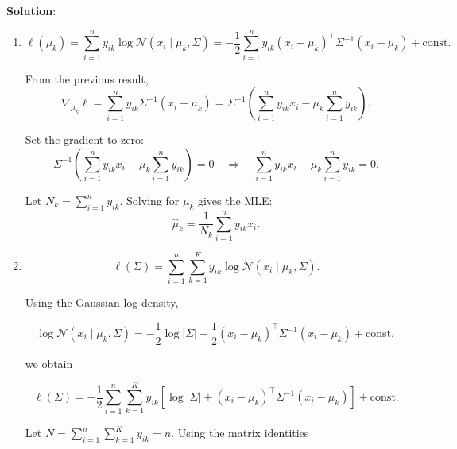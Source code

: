 \documentclass[submit]{harvardml}
\newenvironment{solution}{
    \vspace{2mm}
    \color{blue}\noindent\textbf{Solution}:
}{}
\begin{document}
\begin{solution}
\begin{enumerate}
\[
\nabla_{\mu_k} \ell
=
\sum_{i=1}^{n}
y_{ik}\Sigma^{-1}(x_i-\mu_k).
\]

Factoring out \(\Sigma^{-1}\),

\[
\nabla_{\mu_k} \ell
=
\Sigma^{-1}
\left(
\sum_{i=1}^{n} y_{ik} x_i
-
\mu_k \sum_{i=1}^{n} y_{ik}
\right).
\]

Let
\[
N_k = \sum_{i=1}^{n} y_{ik}.
\]

Then the gradient simplifies to

\[
\nabla_{\mu_k} \ell
=
\Sigma^{-1}
\left(
\sum_{i=1}^{n} y_{ik} x_i
-
N_k \mu_k
\right).
\]

In matrix form, letting \(X \in \mathbb{R}^{n\times d}\) contain rows \(x_i^\top\) and
\(y_k \in \mathbb{R}^n\) be the vector with entries \(y_{ik}\),

\[
\nabla_{\mu_k} \ell
=
\Sigma^{-1}
\left(
X^\top y_k
-
N_k \mu_k
\right).
\]
\item \[
\ell(\mu_k)
=
\sum_{i=1}^{n}
y_{ik}\log \mathcal{N}(x_i \mid \mu_k,\Sigma)
=
-\frac{1}{2}
\sum_{i=1}^{n}
y_{ik}(x_i-\mu_k)^\top \Sigma^{-1}(x_i-\mu_k)
+\text{const}.
\]

From the previous result,
\[
\nabla_{\mu_k}\ell
=
\sum_{i=1}^{n} y_{ik}\Sigma^{-1}(x_i-\mu_k)
=
\Sigma^{-1}\left(\sum_{i=1}^{n} y_{ik}x_i - \mu_k\sum_{i=1}^{n} y_{ik}\right).
\]

Set the gradient to zero:
\[
\Sigma^{-1}\left(\sum_{i=1}^{n} y_{ik}x_i - \mu_k\sum_{i=1}^{n} y_{ik}\right)=0
\quad\Longrightarrow\quad
\sum_{i=1}^{n} y_{ik}x_i - \mu_k\sum_{i=1}^{n} y_{ik}=0.
\]

Let \(N_k=\sum_{i=1}^{n} y_{ik}\). Solving for \(\mu_k\) gives the MLE:
\[
\hat{\mu}_k
=
\frac{1}{N_k}\sum_{i=1}^{n} y_{ik}x_i.
\]

\item \[
\ell(\Sigma)
=
\sum_{i=1}^{n}
\sum_{k=1}^{K}
y_{ik}
\log \mathcal{N}(x_i \mid \mu_k,\Sigma).
\]

Using the Gaussian log-density,

\[
\log \mathcal{N}(x_i \mid \mu_k,\Sigma)
=
-\frac{1}{2}
\log |\Sigma|
-\frac{1}{2}
(x_i-\mu_k)^\top \Sigma^{-1}(x_i-\mu_k)
+ \text{const},
\]

we obtain

\[
\ell(\Sigma)
=
-\frac{1}{2}
\sum_{i=1}^{n}
\sum_{k=1}^{K}
y_{ik}
\left[
\log |\Sigma|
+
(x_i-\mu_k)^\top \Sigma^{-1}(x_i-\mu_k)
\right]
+ \text{const}.
\]

Let \(N = \sum_{i=1}^{n}\sum_{k=1}^{K} y_{ik} = n\).
Using the matrix identities


\end{enumerate}
\end{solution}
\end{document}
